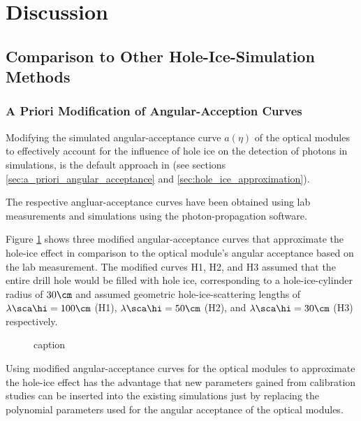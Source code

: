 
\section{Discussion}
\label{sec:discussion}

\subsection{Comparison to Other Hole-Ice-Simulation Methods}
\label{sec:comparison_methods}

\subsubsection{A Priori Modification of Angular-Acception Curves}


Modifying the simulated angular-acceptance curve $a(\eta)$ of the optical modules to effectively account for the influence of hole ice on the detection of photons in simulations, is the default approach in \clsim (see sections \ref{sec:a_priori_angular_acceptance} and \ref{sec:hole_ice_approximation}).


The respective angluar-acceptance curves have been obtained using lab measurements and simulations using the \photonics photon-propagation software. \cite{icepaper}\cite{lundberg}\cite{photonics}

Figure \ref{fig:Wee4ahYa} shows three modified angular-acceptance curves that approximate the hole-ice effect in comparison to the optical module's angular acceptance based on the lab measurement. The modified curves H1, H2, and H3 assumed that the entire drill hole would be filled with hole ice, corresponding to a hole-ice-cylinder radius of $30\cm$ and assumed geometric hole-ice-scattering lengths of $\lambda\sca\hi = 100\cm$ (H1), $\lambda\sca\hi = 50\cm$ (H2), and $\lambda\sca\hi = 30\cm$ (H3) respectively.

\begin{figure}[htbp]
  \caption{caption }
  \label{fig:Wee4ahYa}
\end{figure}

Using modified angular-acceptance curves for the optical modules to approximate the hole-ice effect has the advantage that new parameters gained from calibration studies can be inserted into the existing simulations just by replacing the polynomial parameters used for the angular acceptance of the optical modules.


